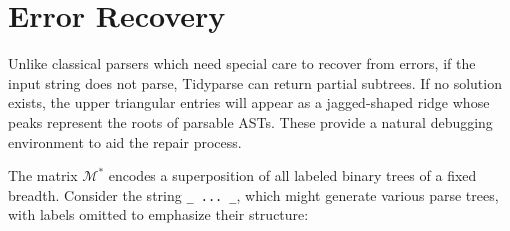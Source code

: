 \documentclass[sigplan,review,anonymous,acmsmall]{acmart}\settopmatter{printfolios=false,printccs=false,printacmref=false}
\begin{document}
    \section{Error Recovery}\label{sec:error}

    Unlike classical parsers which need special care to recover from errors, if the input string does not parse, Tidyparse can return partial subtrees. If no solution exists, the upper triangular entries will appear as a jagged-shaped ridge whose peaks represent the roots of parsable ASTs. These provide a natural debugging environment to aid the repair process.

    The matrix $\mathcal{M}^*$ encodes a superposition of all labeled binary trees of a fixed breadth. Consider the string \texttt{\_ ... \_}, which might generate various parse trees, with labels omitted to emphasize their structure:
\end{document}
